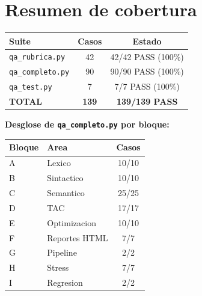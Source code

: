 \documentclass[11pt,a4paper]{article}
\begin{document}
\section{Resumen de cobertura}

\begin{center}
\begin{tabular}{|l|c|c|}
\hline
\textbf{Suite} & \textbf{Casos} & \textbf{Estado} \\
\hline
\texttt{qa\_rubrica.py}  & 42 & \textcolor{verdeOk}{42/42 PASS (100\%)} \\
\texttt{qa\_completo.py} & 90 & \textcolor{verdeOk}{90/90 PASS (100\%)} \\
\texttt{qa\_test.py}     &  7 & \textcolor{verdeOk}{7/7 PASS (100\%)}  \\
\hline
\textbf{TOTAL}           & \textbf{139} & \textcolor{verdeOk}{\textbf{139/139 PASS}} \\
\hline
\end{tabular}
\end{center}

\textbf{Desglose de \texttt{qa\_completo.py} por bloque:}

\begin{center}
\begin{tabular}{|l|l|c|}
\hline
\textbf{Bloque} & \textbf{Area} & \textbf{Casos} \\
\hline
A & Lexico         & 10/10 \\
B & Sintactico     & 10/10 \\
C & Semantico      & 25/25 \\
D & TAC            & 17/17 \\
E & Optimizacion   & 10/10 \\
F & Reportes HTML  &  7/7 \\
G & Pipeline       &  2/2 \\
H & Stress         &  7/7 \\
I & Regresion      &  2/2 \\
\hline
\end{tabular}
\end{center}
\end{document}
